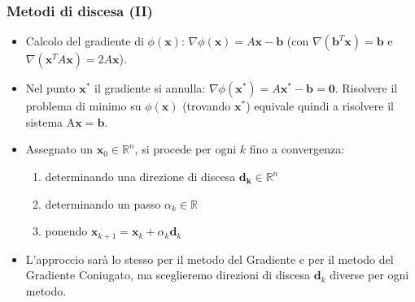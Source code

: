 \documentclass[10pt]{beamer}
\begin{document}
\begin{frame} \frametitle{Metodi di discesa (II)}
 \begin{itemize}
 \item Calcolo del \alert{gradiente} di $\phi(\mathbf{x})$: $\nabla\phi(\mathbf{x}) = A\mathbf{x}-\mathbf{b}$ (con $\nabla(\mathbf{b}^T\mathbf{x}) = \mathbf{b}$ e $\nabla(\mathbf{x}^T A \mathbf{x}) = 2A\mathbf{x}$).
 
 \item Nel punto $\mathbf{x}^{\ast}$ il gradiente si annulla:  $\nabla \phi(\mathbf{x}^{\ast})=A\mathbf{x}^{\ast}-\mathbf{b}=\mathbf{0}$.
 Risolvere il problema di minimo su $\phi(\mathbf{x})$ (trovando $\mathbf{x}^{\ast}$) equivale quindi a risolvere il sistema A$\mathbf{x}=\mathbf{b}$.

 \item Assegnato un $\mathbf{x}_0\in \mathbb{R}^n$, si procede per ogni $\mathit{k}$ fino a convergenza:
    \begin{enumerate}
        \item determinando una direzione di discesa $\mathbf{d_k} \in \mathbb{R}^n$
        \item determinando un passo $\alpha_k\in \mathbb{R}$
        \item ponendo $\mathbf{x}_{k+1}=\mathbf{x}_{k}+\alpha_k\mathbf{d}_{k}$
    \end{enumerate}
    

    \item L'approccio sarà lo stesso per il metodo del Gradiente e per il metodo del Gradiente Coniugato, ma sceglieremo direzioni di discesa $\mathbf{d}_{k}$ diverse per ogni metodo.

\end{itemize}
\end{frame}
\end{document}

